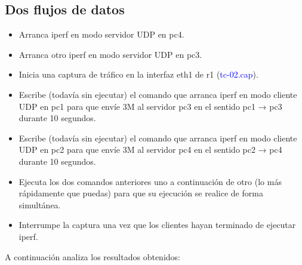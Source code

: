 \documentclass[12pt, a4paper]{report}
\begin{document}
\subsection{Dos flujos de datos}
\begin{itemize}
	\item Arranca iperf en modo servidor UDP en pc4.
	\item Arranca otro iperf en modo servidor UDP en pc3.
	\item Inicia una captura de tráfico en la interfaz eth1 de r1 (\textcolor{blue}{tc-02.cap}).
	\item Escribe (todavía sin ejecutar) el comando que arranca iperf en modo cliente UDP en pc1 para
	que envíe 3M al servidor pc3 en el sentido pc1 → pc3 durante 10 segundos.
	\item Escribe (todavía sin ejecutar) el comando que arranca iperf en modo cliente UDP en pc2 para
	que envíe 3M al servidor pc4 en el sentido pc2 → pc4 durante 10 segundos.
	\item Ejecuta los dos comandos anteriores uno a continuación de otro (lo más rápidamente que puedas)
	para que su ejecución se realice de forma simultánea.
	\item Interrumpe la captura una vez que los clientes hayan terminado de ejecutar iperf.
\end{itemize}
A continuación analiza los resultados obtenidos:
\end{document}
